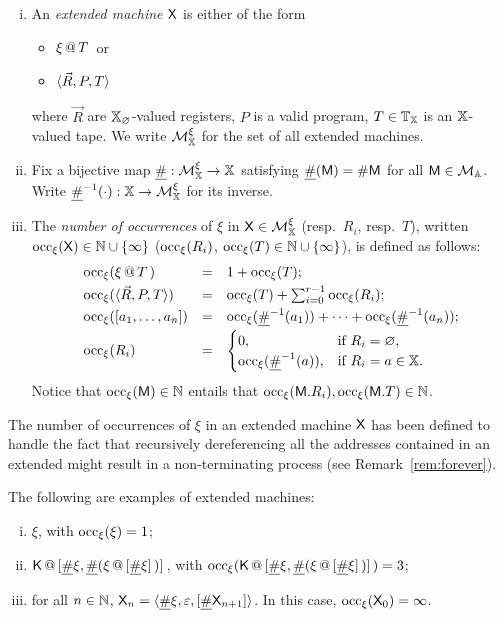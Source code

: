 \begin{defi}\label{def:context-machine}
\begin{enumerate}[(i)]
\item
	An \emph{extended machine $\X$} is either of the form
	\begin{itemize}
	\item $\appT{\xi}{T}$ or
	\item $\tuple{\vec R,P,T}$
	\end{itemize}
	where $\vec R$ are $\XX_\Null$-valued registers, $P$ is a valid program, $T\in\Tapes[\XX]$ is an $\XX$-valued tape. We write $\cMX$ for the set of all extended machines.
\item Fix a bijective map $\Lup : \cMX \to \XX$ satisfying $\Lup(\mM)=\Lookup\mM$ for all \am{} $\mM\in\cM$. Write $\Luinv{\cdot} : \XX\to\cMX$ for its inverse.
\item The \emph{number of occurrences} of $\xi$ in $\X\in\cMX$ (resp.\ $R_i$, resp.\ $T$), written $\occ{\X}\in\nat\cup\set{\infty}$ ($\occ{R_i}$, $\occ{T}\in\nat\cup\set{\infty}$), is defined as follows:
\[
	\begin{array}{lcl}
	\occ{\appT{\xi}{T}} &=& 1 + \occ{T};\\[3pt]
	\occ{\tuple{\vec R,P,T}} &=& \occ{T} + \sum_{i=0}^{r-1}\occ{R_i};\\[3pt]
	\occ{[a_1,\dots,a_n]} &=& \occ{\Luinv{a_1}}+\cdots+\occ{\Luinv{a_n}};\\[3pt]
	\occ{R_i}&=&\begin{cases}
	0,&\textrm{if }R_i = \Null,\\
	\occ{\Luinv{a}},&\textrm{if }R_i = a\in\XX.\\
	\end{cases}
	\end{array}
\]
Notice that $\occ{\mM}\in\nat$ entails that $\occ{\mM.R_i},\occ{\mM.T}\in\nat$.
\end{enumerate}
\end{defi}

\noindent
The number of occurrences of $\xi$ in an extended machine $\X$ has been defined to handle the fact that recursively dereferencing all the addresses contained in an extended \am{} might result in a non-terminating process (see Remark~\ref{rem:forever}).

\begin{exas}\label{ex:weird}
The following are examples of extended machines:
\begin{enumerate}[(i)]
\item $\xi$, with $\occ{\xi} = 1$;
\item $\append{\mK}{\Lup{\xi},\Lup{(\append{\xi}{\Lup\xi})}}$, with $\occ{\append{\mK}{\Lup{\xi},\Lup{(\append{\xi}{\Lup\xi})}}} = 3$;
\item\label{ex:weird3} for all $n\in\nat$, $\X_n = \tuple{\Lup\xi,\varepsilon,[\Lup{\X_{n+1}}]}$. In this case, $\occ{\X_0} = \infty$.
\end{enumerate}
\end{exas}

